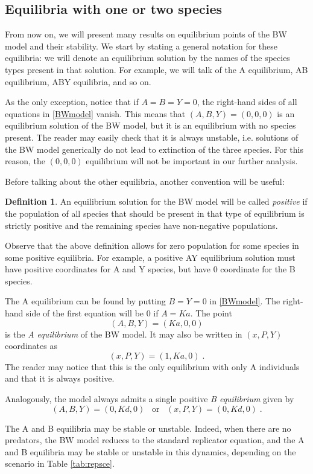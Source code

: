 \documentclass[12pt]{article}
\theoremstyle{definition}
\newtheorem{definition}[theorem]{Definition}
\begin{document}
\subsection{Equilibria with one or two species} \label{sub:equil12}
From now on, we will present many results on equilibrium points of the BW model and their stability. We start by stating a general notation for these equilibria: we will denote an equilibrium solution by the names of the species types present in that solution. For example, we will talk of the A equilibrium, AB equilibrium, ABY equilibria, and so on.

As the only exception, notice that if $A=B=Y=0$, the right-hand sides of all equations in \eqref{BWmodel} vanish. This means that $(A,B,Y)=(0,0,0)$ is an equilibrium solution of the BW model, but it is an equilibrium with no species present. The reader may easily check that it is always unstable, i.e. solutions of the BW model generically do not lead to extinction of the three species. For this reason, the $(0,0,0)$ equilibrium will not be important in our further analysis. 

Before talking about the other equilibria, another convention will be useful:
\begin{definition}
	An equilibrium solution for the BW model will be called \emph{positive} if the population of all species that should be present in that type of equilibrium is strictly positive and the remaining species have non-negative populations.
\end{definition}

Observe that the above definition allows for zero population for some species in some positive equilibria. For example, a positive AY equilibrium solution must have positive coordinates for A and Y species, but have 0 coordinate for the B species. 

The A equilibrium can be found by putting $B=Y=0$ in \eqref{BWmodel}. The right-hand side of the first equation will be 0 if $A=Ka$. The point
\[(A,B,Y)=(Ka,0,0)\]
is the \emph{A equilibrium} of the BW model. It may also be written in $(x,P,Y)$ coordinates as 
\[(x,P,Y)=(1,Ka,0)\;.\]
The reader may notice that this is the only equilibrium with only A individuals and that it is always positive.

Analogously, the model always admits a single positive \emph{B equilibrium} given by
\[(A,B,Y)=(0,Kd,0) \;\;\; \mathrm{or}\;\;\; (x,P,Y)=(0,Kd,0)\;.\]

The A and B equilibria may be stable or unstable. Indeed, when there are no predators, the BW model reduces to the standard replicator equation, and the A and B equilibria may be stable or unstable in this dynamics, depending on the scenario in Table \ref{tab:repsce}.
\end{document}
